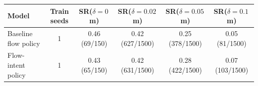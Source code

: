 \begin{tabular}{@{}l c cccc@{}}
\toprule
Model & Train seeds & SR($\delta{=}0$\,m) & SR($\delta{=}0.02$\,m) & SR($\delta{=}0.05$\,m) & SR($\delta{=}0.1$\,m) \\
\midrule
Baseline flow policy & 1 & 0.46 \scriptsize(69/150) & 0.42 \scriptsize(627/1500) & 0.25 \scriptsize(378/1500) & 0.05 \scriptsize(81/1500) \\
Flow-intent policy & 1 & 0.43 \scriptsize(65/150) & 0.42 \scriptsize(631/1500) & 0.28 \scriptsize(422/1500) & 0.07 \scriptsize(103/1500) \\
\bottomrule
\end{tabular}
